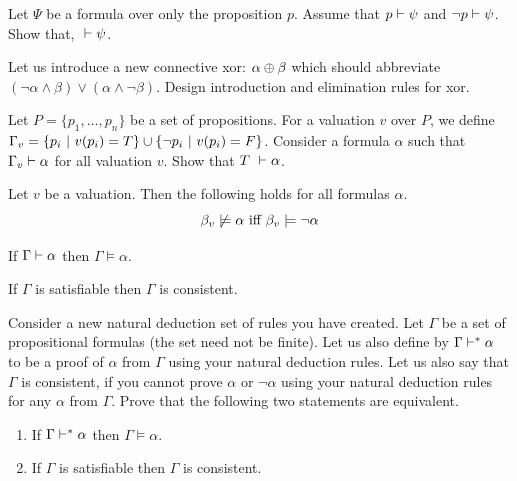 \begin{exercise}
Let $\Psi$ be a formula over only the proposition $p$. Assume that $p \vdash \psi$ and $\neg p \vdash \psi$. Show that,  \true $~\vdash \psi$.
\end{exercise}

\begin{exercise}
 Let us introduce a new connective xor: $\alpha \oplus \beta$ which should abbreviate $(\neg \alpha \wedge \beta) \vee (\alpha \wedge \neg \beta)$. Design introduction and elimination rules for xor.
\end{exercise}

\begin{exercise}
Let $P = \{p_1,\dots,p_n\}$ be a set of propositions. For a valuation $v$ over $P$, we define $\Gamma_v = \{p_i ~|~ v(p_i) = T \} \cup \{\neg p_i ~|~ v(p_i) = F \}$. Consider a formula $\alpha$ such that $\Gamma_v \vdash \alpha$ for all valuation $v$. Show that $T ~\vdash \alpha$.
\label{exercise:theorem}
\end{exercise}

\begin{exercise}
\label{exercise_uniqueval}
Let $v$ be a valuation. Then the following holds for all formulas $\alpha$.
\[
\beta_v \not \models \alpha \mbox{ iff } \beta_v \models \neg \alpha
\]
\end{exercise}

\begin{exercise}
 If $\Gamma \vdash \alpha$ then $\Gamma \models \alpha$.
\end{exercise}
\begin{exercise}
If $\Gamma$ is satisfiable then $\Gamma$ is consistent.
\end{exercise}

\begin{exercise}
Consider a new natural deduction set of rules you have created. Let $\Gamma$ be a set of propositional formulas (the set need not be finite). Let us also define by $\Gamma \vdash^* \alpha$ to be a proof of $\alpha$ from $\Gamma$ using your natural deduction rules. Let us also say that $\Gamma$ is consistent, if you cannot prove $\alpha$ or $\neg \alpha$ using your natural deduction rules for any $\alpha$ from $\Gamma$. Prove that the following two statements are equivalent.
\begin{enumerate}
\item If $\Gamma \vdash^* \alpha$ then $\Gamma \models \alpha$.
\item If $\Gamma$ is satisfiable then $\Gamma$ is consistent.
\end{enumerate}
\end{exercise}

